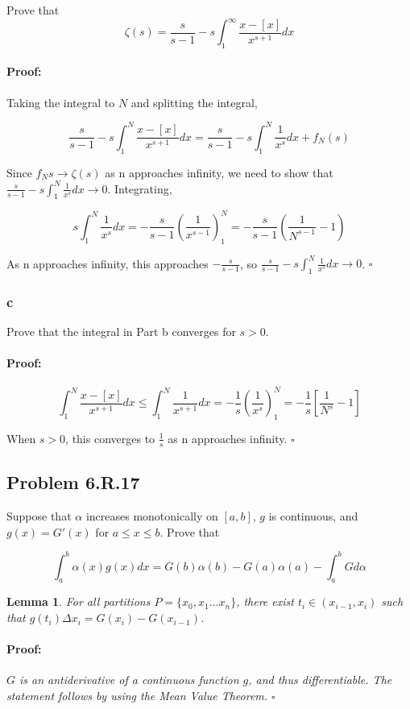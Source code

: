 \documentclass{article}
\newenvironment{proof}{\paragraph{Proof:}}{\hfill$\square$}
\newtheorem{lemma}[theorem]{Lemma}
\begin{document}
Prove that
\[
\zeta(s) = \frac{s}{s-1} - s\int_1^\infty \frac{x -[x]}{x^{s+1}}dx
\]

\begin{proof}
Taking the integral to $N$ and splitting the integral,

\[
\frac{s}{s-1} - s \int_1^N \frac{x -[x]}{x^{s+1}}dx = \frac{s}{s-1} - s\int_1^N \frac{1}{x^s}dx + f_N(s)
\]

Since $f_N{s} \rightarrow \zeta(s)$ as n approaches infinity, we need to show that $\frac{s}{s-1} - s\int_1^N \frac{1}{x^s}dx \rightarrow 0$. Integrating,

\[
s\int_1^N \frac{1}{x^s}dx = -\frac{s}{s-1} \left( \frac{1}{x^{s-1}} \right)_1^N = -\frac{s}{s-1} \left(\frac{1}{N^{s-1}} - 1\right)
\]

As n approaches infinity, this approaches $-\frac{s}{s-1}$, so $\frac{s}{s-1} - s\int_1^N \frac{1}{x^s}dx \rightarrow 0$.
\end{proof}

\subsubsection*{c}

Prove that the integral in Part b converges for $s > 0$.

\begin{proof}
\[
\int_1^N \frac{x - [x]}{x^{s+1}}dx \leq \int_1^N \frac{1}{x^{s+1}}dx = -\frac{1}{s}\left( \frac{1}{x^s} \right)_1^N = -\frac{1}{s}\left[\frac{1}{N^s} - 1 \right]
\]

When $s>0$, this converges to $\frac{1}{s}$ as n approaches infinity.
\end{proof}

\subsection*{Problem 6.R.17}

Suppose that $\alpha$ increases monotonically on $[a, b]$, $g$ is continuous, and $g(x) = G'(x)$ for $a \leq x \leq b$. Prove that

\[
\int_a^b \alpha(x) g(x) dx = G(b)\alpha(b) - G(a)\alpha(a) - \int_a^bGd\alpha
\]

\begin{lemma}
\label{GTiLemma}
For all partitions $P = \{x_0, x_1 \dots x_n\}$, there exist $t_i \in (x_{i-1}, x_i)$ such that $g(t_i)\Delta x_i = G(x_i) - G(x_{i-1})$.
\begin{proof}
$G$ is an antiderivative of a continuous function $g$, and thus differentiable. The statement follows by using the Mean Value Theorem.
\end{proof}
\end{lemma}
\end{document}
